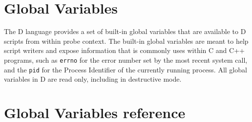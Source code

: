 \section{Global Variables}

The D language provides a set of built-in global variables that are
available to D scripts from within probe context.  The built-in global
variables are meant to help script writers and expose information that
is commonly uses within C and C++ programs, such as \verb|errno| for
the error number set by the most recent system call, and the
\verb|pid| for the Process Identifier of the currently running
process.  All global variables in D are read only, including in
destructive mode.

\section{Global Variables reference}





























